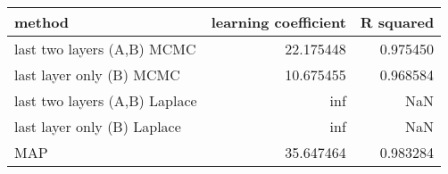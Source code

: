 \begin{tabular}{lrr}
\toprule
                        method &  learning coefficient &  R squared \\
\midrule
    last two layers (A,B) MCMC &             22.175448 &   0.975450 \\
      last layer only (B) MCMC &             10.675455 &   0.968584 \\
 last two layers (A,B) Laplace &                   inf &        NaN \\
   last layer only (B) Laplace &                   inf &        NaN \\
                           MAP &             35.647464 &   0.983284 \\
\bottomrule
\end{tabular}
